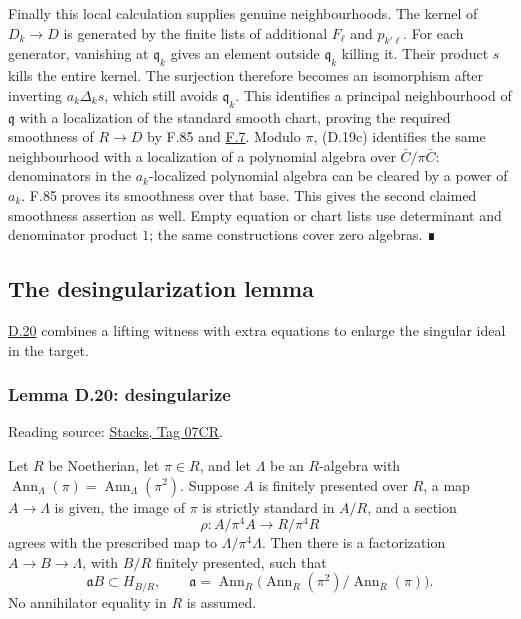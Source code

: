 \documentclass[11pt,a4paper,openany]{report}
\begin{document}
Finally this local calculation supplies genuine neighbourhoods. The kernel of \(D_k\to D\) is generated by the finite lists of additional \(F_\ell\) and \(p_{k'\ell}\). For each generator, vanishing at \(\mathfrak q_k\) gives an element outside \(\mathfrak q_k\) killing it. Their product \(s\) kills the entire kernel. The surjection therefore becomes an isomorphism after inverting \(a_k\Delta_ks\), which still avoids \(\mathfrak q_k\). This identifies a principal neighbourhood of \(\mathfrak q\) with a localization of the standard smooth chart, proving the required smoothness of \(R\to D\) by F.85 and \hyperref[AG-RG-S05-algebra-definition-smooth-at-prime]{F.7}. Modulo \(\pi\), (D.19c) identifies the same neighbourhood with a localization of a polynomial algebra over \(\bar C/\pi\bar C\): denominators in the \(a_k\)-localized polynomial algebra can be cleared by a power of \(a_k\). F.85 proves its smoothness over that base. This gives the second claimed smoothness assertion as well. Empty equation or chart lists use determinant and denominator product \(1\); the same constructions cover zero algebras. ∎

\subsection{The desingularization lemma}\label{AG-RG-S05-the-desingularization-lemma}

\label{AG-RG-S05-smoothing-section-desingularization-lemma}

\hyperref[AG-RG-S05-smoothing-lemma-desingularize]{D.20} combines a lifting witness with extra equations to enlarge the singular ideal in the target.

\label{AG-RG-S05-smoothing-lemma-desingularize}

\subsubsection{Lemma D.20: desingularize}\label{AG-RG-S05-lemma-d.20-desingularize}

Reading source: \href{https://stacks.math.columbia.edu/tag/07CR}{Stacks, Tag 07CR}.

Let \(R\) be Noetherian, let \(\pi\in R\), and let \(\Lambda\) be an \(R\)-algebra with \(\operatorname{Ann}_\Lambda(\pi)=\operatorname{Ann}_\Lambda(\pi^2)\). Suppose \(A\) is finitely presented over \(R\), a map \(A\to\Lambda\) is given, the image of \(\pi\) is strictly standard in \(A/R\), and a section \[
\rho:A/\pi^4A\longrightarrow R/\pi^4R
\] agrees with the prescribed map to \(\Lambda/\pi^4\Lambda\). Then there is a factorization \(A\to B\to\Lambda\), with \(B/R\) finitely presented, such that \[
\mathfrak aB\subset H_{B/R},\qquad
\mathfrak a=\operatorname{Ann}_R
\bigl(\operatorname{Ann}_R(\pi^2)/\operatorname{Ann}_R(\pi)\bigr).
\] No annihilator equality in \(R\) is assumed.
\end{document}

